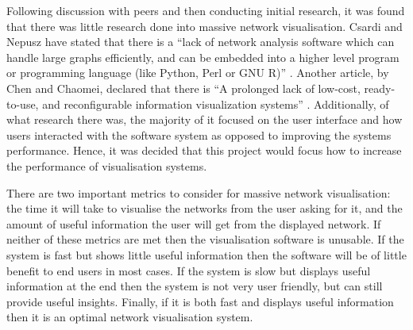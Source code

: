 \documentclass[../dissertation.tex]{subfiles}
\begin{document}
Following discussion with peers and then conducting initial research, it was found that there was little research done into massive network visualisation. Csardi and Nepusz have stated that there is a ``lack of network analysis software which can handle large graphs efficiently, and can be embedded into a higher level program or programming language (like Python, Perl or GNU R)'' \cite{csardi2006igraph}. Another article, by Chen and Chaomei, declared that there is ``A prolonged lack of low-cost, ready-to-use, and reconfigurable information visualization systems'' \cite{chen2005top}. Additionally, of what research there was, the majority of it focused on the user interface and how users interacted with the software system as opposed to improving the systems performance. Hence, it was decided that this project would focus how to increase the performance of visualisation systems.

There are two important metrics to consider for massive network visualisation: the time it will take to visualise the networks from the user asking for it, and the amount of useful information the user will get from the displayed network. If neither of these metrics are met then the visualisation software is unusable. If the system is fast but shows little useful information then the software will be of little benefit to end users in most cases. If the system is slow but displays useful information at the end then the system is not very user friendly, but can still provide useful insights. Finally, if it is both fast and displays useful information then it is an optimal network visualisation system.
\end{document}
